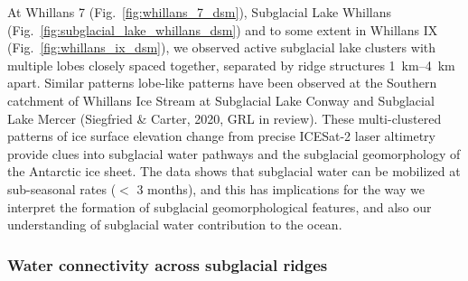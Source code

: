 At Whillans 7 (Fig.~\ref{fig:whillans_7_dsm}), Subglacial Lake Whillans (Fig.~\ref{fig:subglacial_lake_whillans_dsm}) and to some extent in Whillans IX (Fig.~\ref{fig:whillans_ix_dsm}), we observed active subglacial lake clusters with multiple lobes closely spaced together, separated by ridge structures \SIrange{1}{4}{\kilo\metre} apart.
Similar patterns lobe-like patterns have been observed at the Southern catchment of Whillans Ice Stream at Subglacial Lake Conway and Subglacial Lake Mercer (Siegfried \& Carter, 2020, GRL in review). %
These multi-clustered patterns of ice surface elevation change from precise ICESat-2 laser altimetry provide clues into subglacial water pathways and the subglacial geomorphology of the Antarctic ice sheet.
The data shows that subglacial water can be mobilized at sub-seasonal rates ($<$ 3 months), and this has implications for the way we interpret the formation of subglacial geomorphological features, and also our understanding of subglacial water contribution to the ocean.

\subsubsection{Water connectivity across subglacial ridges}

